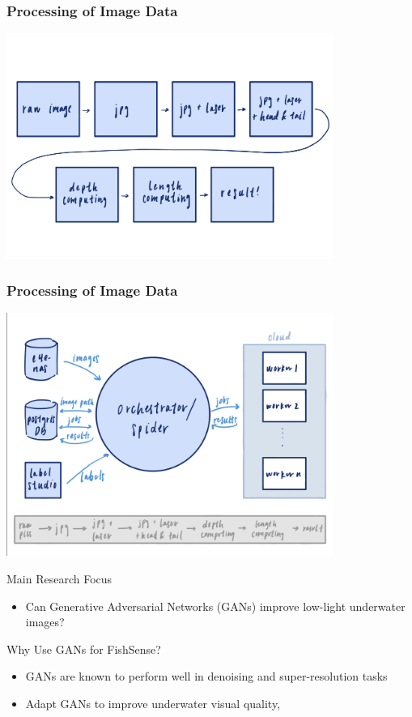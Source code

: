 \begin{frame}
    \frametitle{Processing of Image Data}

    \centering
    \includegraphics[width=0.8\textwidth, keepaspectratio]{images/flow1.png}
\end{frame}

\begin{frame}
    \frametitle{Processing of Image Data}

    \centering
    \includegraphics[width=0.8\textwidth, keepaspectratio]{images/flow2.png}
\end{frame}

\begin{frame}{Main Research Focus}
    \begin{itemize}
        \item Can Generative Adversarial Networks (GANs) improve low-light underwater images?
    \end{itemize}
\end{frame}

\begin{frame}{Why Use GANs for FishSense?}
    \begin{itemize}
        \item GANs are known to perform well in denoising and super-resolution tasks
        \item Adapt GANs to improve underwater visual quality,
    \end{itemize}
\end{frame}

